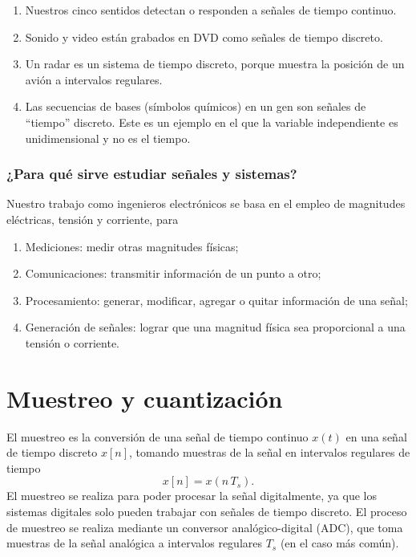 \begin{enumerate}
	\item Nuestros cinco sentidos detectan o responden a señales de tiempo continuo.
	\item Sonido y video están grabados en DVD como señales de tiempo discreto.
	\item Un radar es un sistema de tiempo discreto, porque muestra la posición de un avión a intervalos regulares.
	\item Las secuencias de bases (símbolos químicos) en un gen son señales de ``tiempo'' discreto. Este es un ejemplo en el que la variable independiente es unidimensional y no es el tiempo.
\end{enumerate}

\subsubsection{¿Para qué sirve estudiar señales y sistemas?}
Nuestro trabajo como ingenieros electrónicos se basa en el empleo de magnitudes eléctricas, tensión y corriente, para
\begin{enumerate}
	\item Mediciones: medir otras magnitudes físicas;
	\item Comunicaciones: transmitir información de un punto a otro;
	\item Procesamiento: generar, modificar, agregar o quitar información de una señal;
	\item Generación de señales: lograr que una magnitud física sea proporcional a una tensión o corriente.
\end{enumerate}

\section{Muestreo y cuantización}

El muestreo es la conversión de una señal de tiempo continuo $x(t)$ en una señal de tiempo discreto $x[n]$, tomando muestras de la señal en intervalos regulares de tiempo
\begin{equation}
	x[n] = x(n \, T_{s}).
\end{equation}
El muestreo se realiza para poder procesar la señal digitalmente, ya que los sistemas digitales solo pueden trabajar con señales de tiempo discreto. El proceso de muestreo se realiza mediante un conversor analógico-digital (ADC), que toma muestras de la señal analógica a intervalos regulares $T_{s}$ (en el caso más común).

